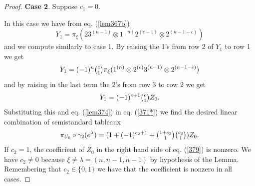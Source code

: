 \documentclass[11pt]{amsart}
\theoremstyle{definition}
\numberwithin{equation}{section}
\begin{document}
\begin{proof}
	\textbf{Case 2}. Suppose $c_1 =0$. 
	
	In this case we have from eq. (\ref{lem367b}) \[Y_1=\pi_\xi(23^{(n-1)} \otimes 1^{(n)}2^{(c-1)} \otimes 2^{(n-1-c)})\] and we compute similarly to case 1. By raising the 1's from row 2 of $Y_1$ to row 1 we get \[Y_1=(-1)^n\tbinom{c}{1}\pi_\xi(1^{(n)}\otimes2^{(c)}3^{(n-1)}\otimes2^{(n-1-c)})\]
	and by raising in the last term the 2's from row 3 to row 2 we get
	\[Y_1=(-1)^{c+1}\tbinom{c}{1}Z_0.\]
	Substituting this and eq. (\ref{lem374}) in eq. (\ref{371*}) we find the desired linear combination of semistandard tableaux  
	 \begin{equation}\label{379}
		\pi_{U_0} \circ \gamma_2 (e^\lambda)=(1+(-1)^{c_2+1}+\tbinom{1+c_2}{1}\tbinom{c_2}{1})Z_0.
	\end{equation} If $c_2=1$, the coefficient of $Z_0$ in the right hand side of eq. (\ref{379}) is nonzero. We have $c_2 \neq 0$ because $\xi \neq \lambda = (n,n-1,n-1)$ by hypothesis of the Lemma. Remembering that $c_2\in \{0,1\}$ we have that the coefficient is nonzero in all cases.
\end{proof}
\end{document}

